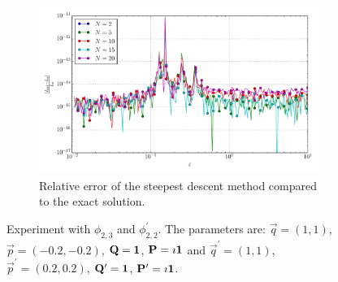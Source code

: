 \documentclass[a4paper,10pt]{article}
\begin{document}
\begin{figure}[ht!]
\begin{subfigure}[t]{0.5\linewidth}
    \includegraphics[width=\linewidth]{./plots/tp_2d_conv_eps_(2,3)_(2,2)_err_rel_nsd.pdf}
    \caption{Relative error of the steepest descent method compared to the exact solution.}
    \label{fig:tp_2d_conv_eps_23_22_err_nsd}
  \end{subfigure}
  \label{fig:tp_2d_conv_eps_23_22}
  \caption{Experiment with $\phi_{2,3}$ and $\phi_{2,2}^{\prime}$.
  The parameters are:
  $\vec{q} = (1, 1)$,
  $\vec{p} = (-0.2, -0.2)$,
  $\mathbf{Q} = \mathbf{1}$,
  $\mathbf{P} = \imath \mathbf{1}$
  and
  $\vec{q}^\prime = (1, 1)$,
  $\vec{p}^\prime = (0.2, 0.2)$,
  $\mathbf{Q}^\prime = \mathbf{1}$,
  $\mathbf{P}^\prime = \imath \mathbf{1}$.}
\end{figure}
\end{document}
